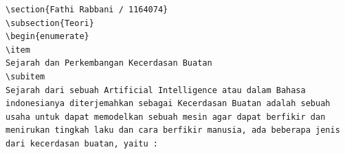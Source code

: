 \begin{enumerate}
\begin{itemize}
\begin{verbatim}
\section{Fathi Rabbani / 1164074}
\subsection{Teori}
\begin{enumerate}
\item
Sejarah dan Perkembangan Kecerdasan Buatan
\subitem
Sejarah dari sebuah Artificial Intelligence atau dalam Bahasa indonesianya diterjemahkan sebagai Kecerdasan Buatan adalah sebuah usaha untuk dapat memodelkan sebuah mesin agar dapat berfikir dan menirukan tingkah laku dan cara berfikir manusia, ada beberapa jenis dari kecerdasan buatan, yaitu :


\end{verbatim}
\end{itemize}
\end{enumerate}
